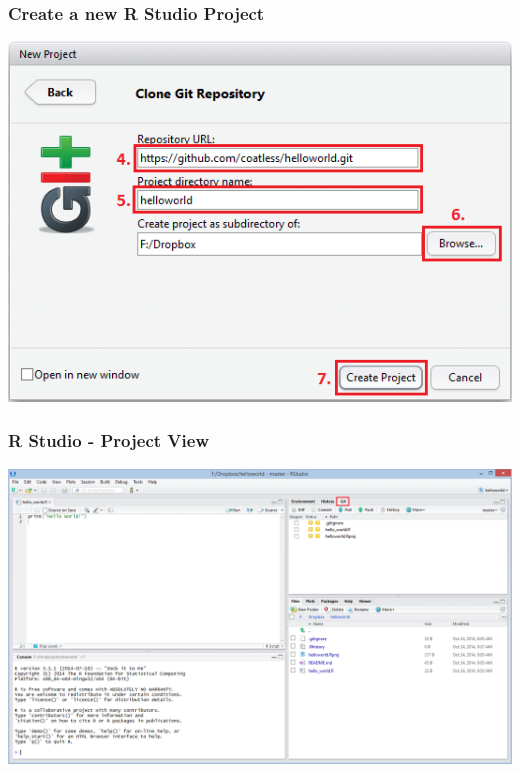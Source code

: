 \documentclass{beamer}\usepackage[]{graphicx}\usepackage[]{color}
\begin{document}
\begin{frame}
\frametitle{Create a new R Studio Project}

\begin{center}
\includegraphics[scale=0.45]{img/project/git_project_details.png}
\end{center}

 
\end{frame}





\begin{frame}
\frametitle{R Studio - Project View}

\begin{center}
\includegraphics[scale=0.31]{img/project/project_view_git.png}
\end{center}

\end{frame}
\end{document}
